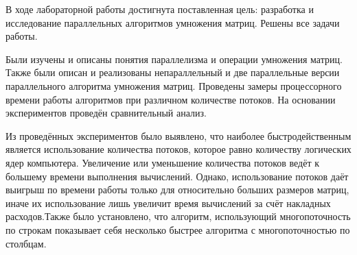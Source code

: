 В ходе лабораторной работы достигнута поставленная цель: разработка и исследование параллельных алгоритмов умножения матриц. Решены все задачи работы.

Были изучены и описаны понятия параллелизма и операции умножения матриц. Также были описан и реализованы непараллельный и две параллельные версии параллельного алгоритма умножения матриц. Проведены замеры процессорного времени работы алгоритмов при различном количестве потоков. На основании экспериментов проведён сравнительный анализ.

Из проведённых экспериментов было выявлено, что наиболее быстродейственным является использование количества потоков, которое равно количеству логических ядер компьютера. Увеличение или уменьшение количества потоков ведёт к большему времени выполнения вычислений. Однако, использование потоков даёт выигрыш по времени работы только для относительно больших размеров матриц, иначе их использование лишь увеличит время вычислений за счёт накладных расходов.Также было установлено, что алгоритм, использующий многопоточность по строкам показывает себя несколько быстрее алгоритма с многопоточностью по столбцам.